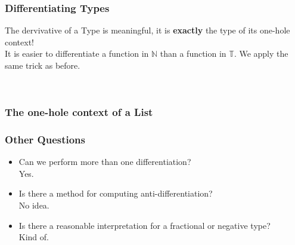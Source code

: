 \documentclass[10pt]{beamer}
\begin{document}
\begin{frame}[fragile]
    \frametitle{Differentiating Types}
    The dervivative of a Type is meaningful, it is \textbf{exactly} the type of its one-hole context! \\

    It is easier to differentiate a function in $\mathbb{N}$ than a function in $\mathbb{T}$. We apply the same trick as before.

    \begin{center}
    \end{center} \\

    

\end{frame}


\begin{frame}[fragile]
    \frametitle{The one-hole context of a List}
    
\end{frame}


\begin{frame}[fragile]
    \frametitle{Other Questions}
    \begin{itemize}
        \item Can we perform more than one differentiation? \\
            Yes.
        \item Is there a method for computing anti-differentiation? \\
            No idea.
        \item Is there a reasonable interpretation for a fractional or negative type? \\
            Kind of.
    \end{itemize} 

\end{frame}
\end{document}
